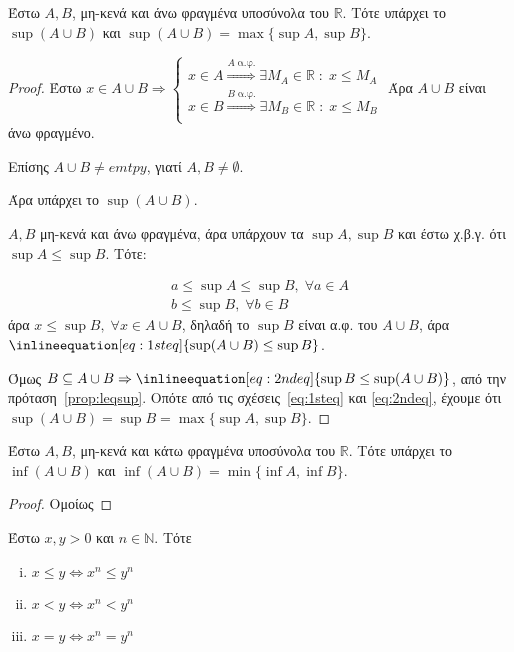 \documentclass[main.tex]{subfiles}
\begin{document}
\begin{prop}
    Έστω $ A, B $, μη-κενά και άνω φραγμένα υποσύνολα του $ \mathbb{R} $. Τότε υπάρχει 
    το $ \sup (A \cup B) $ και $ \sup (A \cup B) = \max \{ \sup A, \sup B \} $.
\end{prop}

\begin{proof}
    Έστω $ x \in A \cup B \Rightarrow \begin{cases} x \in A \overset{A \; \text{α.φ.}}{
    \Rightarrow} \exists M_{A} \in \mathbb{R} \; : \; x \leq M_{A} \\
x \in B \overset{B \; \text{α.φ.}}{ \Rightarrow} \exists M_{B} \in \mathbb{R} \; 
: \; x \leq M_{B}  \\
\end{cases} $  
Άρα $ A \cup B $ είναι άνω φραγμένο.

Επίσης $ A \cup B \neq emtpy $, γιατί $ A, B \neq \emptyset $. 

Άρα υπάρχει το $ \sup (A \cup B) $.

$ A,B $ μη-κενά και άνω φραγμένα, άρα υπάρχουν τα $ \sup A, \sup B $ και έστω χ.β.γ. 
ότι $ \sup A \leq \sup B $. Τότε:

\begin{gather*}
    a \leq \sup A \leq \sup B, \; \forall a \in A \\
    b \leq \sup B, \; \forall b \in B 
\end{gather*}
άρα $ x \leq \sup B, \; \forall x \in A \cup B  $, δηλαδή το $ \sup B $ είναι α.φ. του 
$ A \cup B $, άρα $ \inlineequation[eq:1steq]{\sup (A \cup B) \leq \sup B} $.

Όμως $ B \subseteq A \cup B \Rightarrow \inlineequation[eq:2ndeq]{\sup B \leq \sup (A \cup B)} $, από την 
πρόταση~\ref{prop:leqsup}. Οπότε από τις σχέσεις~\eqref{eq:1steq} και \eqref{eq:2ndeq}, έχουμε ότι $
\sup (A \cup B) = \sup B = \max \{ \sup A, \sup B \} $.
\end{proof}

\begin{prop}
    Έστω $ A, B $, μη-κενά και κάτω φραγμένα υποσύνολα του $ \mathbb{R} $. Τότε υπάρχει 
    το $ \inf (A \cup B) $ και $ \inf (A \cup B) = \min \{ \inf A, \inf B \} $.
\end{prop}

\begin{proof}
    Ομοίως
\end{proof}

\begin{lem}\label{lem:ineqs}
    Έστω $ x,y >0 $ και $ n \in \mathbb{N} $. Τότε
    \begin{enumerate}[i)]
        \item $ x \leq y \Leftrightarrow x^{n} \leq y^{n} $
        \item $ x < y \Leftrightarrow x^{n} < y^{n} $ \label{lem:ineqreal2}
        \item $ x = y \Leftrightarrow x^{n} = y^{n} $ \label{lem:ineqreal3}
    \end{enumerate}
\end{lem}
\end{document}
